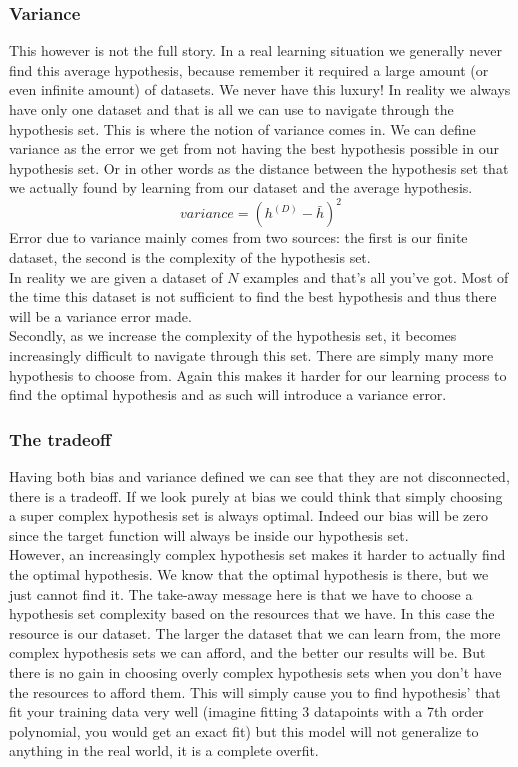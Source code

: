 \subsubsection{Variance}
This however is not the full story. In a real learning situation we generally never find this average hypothesis, because remember it required a large amount (or even infinite amount) of datasets. We never have this luxury! In reality we always have only one dataset and that is all we can use to navigate through the hypothesis set. This is where the notion of variance comes in. We can define variance\cite{caltechmachinelearning} as the error we get from not having the best hypothesis possible in our hypothesis set. Or in other words as the distance between the hypothesis set that we actually found by learning from our dataset and the average hypothesis.
$$
variance = (h^{(D)} - \bar{h})^{2}
$$
Error due to variance mainly comes from two sources: the first is our finite dataset, the second is the complexity of the hypothesis set.\\
In reality we are given a dataset of $N$ examples and that's all you've got. Most of the time this dataset is not sufficient to find the best hypothesis and thus there will be a variance error made. \\
Secondly, as we increase the complexity of the hypothesis set, it becomes increasingly difficult to navigate through this set. There are simply many more hypothesis to choose from. Again this makes it harder for our learning process to find the optimal hypothesis and as such will introduce a variance error.
\subsubsection{The tradeoff}
Having both bias and variance defined we can see that they are not disconnected, there is a tradeoff. If we look purely at bias we could think that simply choosing a super complex hypothesis set is always optimal. Indeed our bias will be zero since the target function will always be inside our hypothesis set. \\
However, an increasingly complex hypothesis set makes it harder to actually find the optimal hypothesis. We know that the optimal hypothesis is there, but we just cannot find it. The take-away message here is that we have to choose a hypothesis set complexity based on the resources that we have. In this case the resource is our dataset. The larger the dataset that we can learn from, the more complex hypothesis sets we can afford, and the better our results will be. But there is no gain in choosing overly complex hypothesis sets when you don't have the resources to afford them. This will simply cause you to find hypothesis' that fit your training data very well (imagine fitting 3 datapoints with a 7th order polynomial, you would get an exact fit) but this model will not generalize to anything in the real world, it is a complete overfit.
